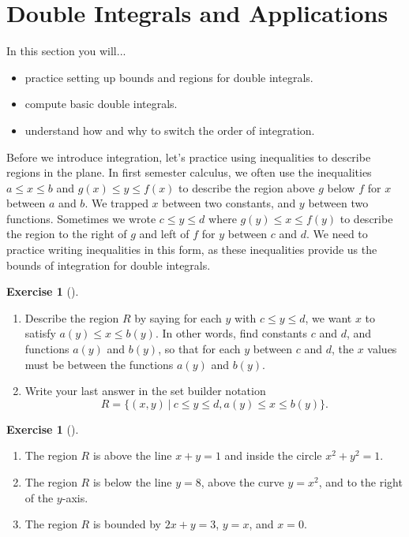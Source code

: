 \documentclass[10pt,]{book}
\theoremstyle{plain}
\theoremstyle{definition}
\theoremstyle{definition}
\theoremstyle{definition}
\theoremstyle{definition}
\newtheorem{exploration}[project]{Exercise}
\theoremstyle{definition}
\numberwithin{equation}{section}
\begin{document}
\section[{Double Integrals and Applications}]{Double Integrals and Applications}\label{section-37}
In this section you will... \leavevmode%
\begin{itemize}[label=\textbullet]
\item{}practice setting up bounds and regions for double integrals.%
\item{}compute basic double integrals.%
\item{}understand how and why to switch the order of integration.%
\end{itemize}
%
\par
Before we introduce integration, let's practice using inequalities to describe regions in the plane. In first semester calculus, we often use the inequalities \(a\leq x\leq b\) and \(g(x)\leq y\leq f(x)\) to describe the region above \(g\) below \(f\) for \(x\) between \(a\) and \(b\). We trapped \(x\) between two constants, and \(y\) between two functions. Sometimes we wrote \(c\leq y\leq d\) where \(g(y)\leq x\leq f(y)\) to describe the region to the right of \(g\) and left of \(f\) for \(y\) between \(c\) and \(d\). We need to practice writing inequalities in this form, as these inequalities provide us the bounds of integration for double integrals.%
\begin{exploration}[]\label{exploration-246}
\leavevmode%
\begin{enumerate}[font=\bfseries,label=(\alph*),ref=\alph*]
\item\label{task-661} Describe the region \(R\) by saying for each \(y\) with \(c\leq y\leq d\), we want \(x\) to satisfy \(a(y)\leq x\leq b(y)\). In other words, find constants \(c\) and \(d\), and functions \(a(y)\) and \(b(y)\), so that for each \(y\) between \(c\) and \(d\), the \(x\) values must be between the functions \(a(y)\) and \(b(y)\).%
\item\label{task-662} Write your last answer in the set builder notation%
\begin{equation*}
R=\{(x,y)\ | \ c\leq y\leq d, a(y)\leq x\leq b(y)\}.
\end{equation*}
%
\end{enumerate}
\end{exploration}
\begin{exploration}[]\label{exploration-247}
\leavevmode%
\begin{enumerate}[font=\bfseries,label=(\alph*),ref=\alph*]
\item\label{task-663} The region \(R\) is above the line \(x+y=1\) and inside the circle \(x^2+y^2=1\).%
\item\label{task-664} The region \(R\) is below the line \(y=8\), above the curve \(y=x^2\), and to the right of the \(y\)-axis.%
\item\label{task-665} The region \(R\) is bounded by \(2x+y=3\), \(y=x\), and \(x=0\).%
\end{enumerate}
\end{exploration}
\end{document}
